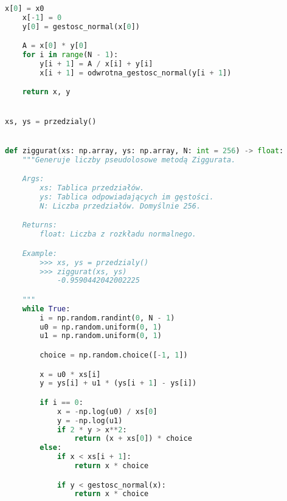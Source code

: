 \documentclass[12pt,letterpaper]{article}
\theoremstyle{definition}
\begin{document}
\begin{lstlisting}[language=Python, caption=Implementacja metody Zigguratu]
    x[0] = x0
    x[-1] = 0
    y[0] = gestosc_normal(x[0])

    A = x[0] * y[0]
    for i in range(N - 1):
        y[i + 1] = A / x[i] + y[i]
        x[i + 1] = odwrotna_gestosc_normal(y[i + 1])

    return x, y


xs, ys = przedzialy()


def ziggurat(xs: np.array, ys: np.array, N: int = 256) -> float:
    """Generuje liczby pseudolosowe metodą Ziggurata.

    Args:
        xs: Tablica przedziałów.
        ys: Tablica odpowiadających im gęstości.
        N: Liczba przedziałów. Domyślnie 256.

    Returns:
        float: Liczba z rozkładu normalnego.

    Example:
        >>> xs, ys = przedzialy()
        >>> ziggurat(xs, ys)
            -0.9590442042002225

    """
    while True:
        i = np.random.randint(0, N - 1)
        u0 = np.random.uniform(0, 1)
        u1 = np.random.uniform(0, 1)

        choice = np.random.choice([-1, 1])

        x = u0 * xs[i]
        y = ys[i] + u1 * (ys[i + 1] - ys[i])

        if i == 0:
            x = -np.log(u0) / xs[0]
            y = -np.log(u1)
            if 2 * y > x**2:
                return (x + xs[0]) * choice
        else:
            if x < xs[i + 1]:
                return x * choice

            if y < gestosc_normal(x):
                return x * choice

\end{lstlisting}
\end{document}
